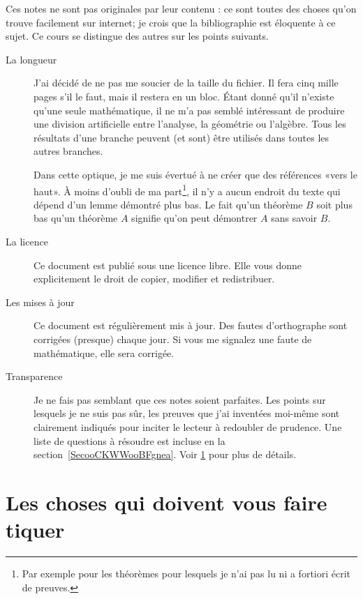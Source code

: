 Ces notes ne sont pas originales par leur contenu : ce sont toutes des choses qu'on trouve facilement sur internet; je crois que la bibliographie est éloquente à ce sujet. Ce cours se distingue des autres sur les points suivants.
\begin{description}
	\item[La longueur] J'ai décidé de ne pas me soucier de la taille du fichier. Il fera cinq mille pages s'il le faut, mais il restera en un bloc. Étant donné qu'il n'existe qu'une seule mathématique, il ne m'a pas semblé intéressant de produire une division artificielle entre l'analyse, la géométrie ou l'algèbre. Tous les résultats d'une branche peuvent (et sont) être utilisés dans toutes les autres branches.

		Dans cette optique, je me suis évertué à ne créer que des références «vers le haut». À moins d'oubli de ma part\footnote{Par exemple pour les théorèmes pour lesquels je n'ai pas lu ni a fortiori écrit de preuves.}, il n'y a aucun endroit du texte qui dépend d'un lemme démontré plus bas. Le fait qu'un théorème \( B\) soit plus bas qu'un théorème \( A\) signifie qu'on peut démontrer \( A\) sans savoir \( B\).

	\item[La licence] Ce document est publié sous une licence libre. Elle vous donne explicitement le droit de copier, modifier et redistribuer.

	\item[Les mises à jour] Ce document est régulièrement mis à jour. Des fautes d'orthographe sont corrigées (presque) chaque jour. Si vous me signalez une faute de mathématique, elle sera corrigée.
	\item[Transparence] Je ne fais pas semblant que ces notes soient parfaites. Les points sur lesquels je ne suis pas sûr, les preuves que j'ai inventées moi-même sont clairement indiqués pour inciter le lecteur à redoubler de prudence. Une liste de questions à résoudre est incluse en la section~\ref{SecooCKWWooBFgnea}. Voir \ref{SECooWVHBooCaYoXP} pour plus de détails.
\end{description}

\section{Les choses qui doivent vous faire tiquer}
\label{SECooWVHBooCaYoXP}

